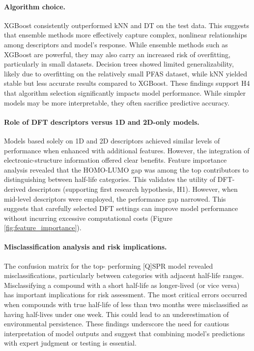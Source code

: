 \paragraph{Algorithm choice.} 
XGBoost consistently outperformed kNN and DT on the test data. This suggests that ensemble methods more effectively capture complex, nonlinear relationships among descriptors and model’s response. While ensemble methods such as XGBoost are powerful, they may also carry an increased risk of overfitting, particularly in small datasets. Decision trees showed limited generalizability, likely due to overfitting on the relatively small PFAS dataset, while kNN yielded stable but less accurate results compared to XGBoost. These findings support H4 that algorithm selection significantly impacts model performance. While simpler models may be more interpretable, they often sacrifice predictive accuracy.

\paragraph{Role of DFT descriptors versus 1D and 2D-only models.}
Models based solely on 1D and 2D descriptors achieved similar levels of performance when enhanced with additional features. However, the integration of electronic-structure information offered clear benefits. Feature importance analysis revealed that the HOMO-LUMO gap was among the top contributors to distinguishing between half-life categories. This validates the utility of DFT-derived descriptors (supporting first research hypothesis, H1). However, when mid-level descriptors were employed, the performance gap narrowed. This suggests that carefully selected DFT settings can improve model performance without incurring excessive computational costs (Figure \ref{fig:feature_importance}).

\paragraph{Misclassification analysis and risk implications.} 
The confusion matrix for the top- performing [Q]SPR model revealed misclassifications, particularly between categories with adjacent half-life ranges. Misclassifying a compound with a short half-life as longer-lived (or vice versa) has important implications for risk assessment. The most critical errors occurred when compounds with true half-life of less than two months were misclassified as having half-lives under one week. This could lead to an underestimation of environmental persistence. These findings underscore the need for cautious interpretation of model outputs and suggest that combining model’s predictions with expert judgment or testing is essential.

